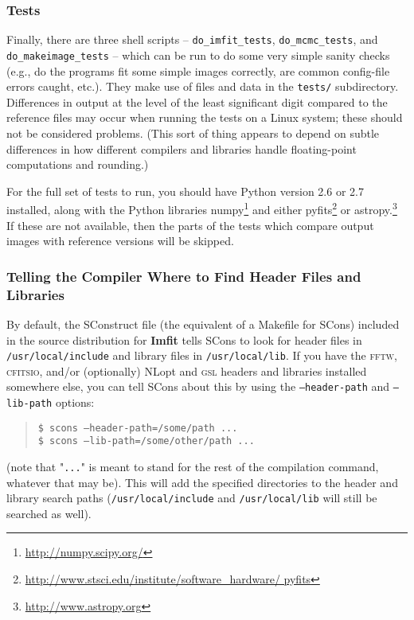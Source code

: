 \documentclass[10pt,a4paper,article]{memoir}
\newcommand{\imfit}{\textbf{Imfit}}
\begin{document}
\subsubsection{Tests}

Finally, there are three shell scripts -- \texttt{do\_imfit\_tests},
\texttt{do\_mcmc\_tests}, and \texttt{do\_makeimage\_tests} -- which can
be run to do some very simple sanity checks (e.g., do the programs fit
some simple images correctly, are common config-file errors caught,
etc.). They make use of files and data in the \texttt{tests/}
subdirectory. Differences in output at the level of the least
significant digit compared to the reference files may occur when running
the tests on a Linux system; these should not be considered problems.
(This sort of thing appears to depend on subtle differences in how
different compilers and libraries handle floating-point computations and
rounding.)

For the full set of tests to run,
you should have Python version 2.6 or 2.7 installed, along with the
Python libraries numpy\footnote{\url{http://numpy.scipy.org/}} and
either
pyfits\footnote{\url{http://www.stsci.edu/institute/software_hardware/
pyfits}} or astropy.\footnote{\url{http://www.astropy.org}} If these are
not available, then the parts of the tests which compare output images
with reference versions will be skipped.



\subsubsection{Telling the Compiler Where to Find Header Files and Libraries}

By default, the SConstruct file (the equivalent of a Makefile for SCons) included
in the source distribution for \imfit{}
tells SCons to look for header files in \texttt{/usr/local/include} and
library files in \texttt{/usr/local/lib}. If you have the \textsc{fftw},
\textsc{cfitsio}, and/or (optionally) NLopt and \textsc{gsl} headers and
libraries installed somewhere else, you can tell SCons about this by
using the
\texttt{--header-path} and \texttt{--lib-path} options:
\begin{quote}
\texttt{\$ scons --header-path=/some/path ...} \\
\texttt{\$ scons --lib-path=/some/other/path ...}
\end{quote}
(note that "\texttt{...}" is meant to stand for the rest of the compilation command,
whatever that may be). This will add the specified directories to the
header and library search paths (\texttt{/usr/local/include} and \texttt{/usr/local/lib}
will still be searched as well).
\end{document}
